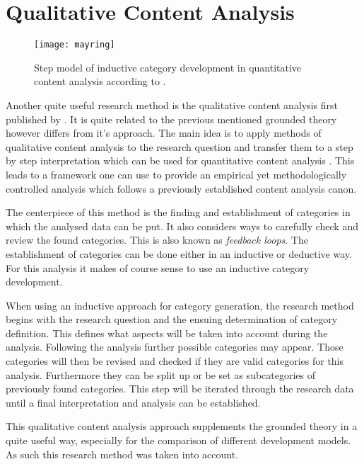 
\section{Qualitative Content Analysis} %

\begin{figure}[htbp]
  \centering
  \texttt{[image: mayring]}
  \caption{Step model of inductive category development in quantitative content
    analysis according to \citeauthor{Mayring2008} \cite{Mayring2000,Mayring2008}.}
\end{figure}

Another quite useful research method is the qualitative content analysis first
published by \textcite{Mayring2008}. It is quite related to the previous
mentioned grounded theory however differs from it's approach. The main idea is
to apply methods of qualitative content analysis to the research question and
transfer them to a step by step interpretation which can be used for
quantitative content analysis \cite{Mayring2000}. This leads to a framework one
can use to provide an empirical yet methodologically controlled analysis which
follows a previously established content analysis canon.

The centerpiece of this method is the finding and establishment of categories
in which the analysed data can be put. It also considers ways to carefully
check and review the found categories. This is also known as \emph{feedback
loops}. The establishment of categories can be done either in an inductive or
deductive way. For this analysis it makes of course sense to use an inductive
category development.

When using an inductive approach for category generation, the research method
begins with the research question and the ensuing determination of category
definition. This defines what aspects will be taken into account during the
analysis. Following the analysis further possible categories may appear. Those
categories will then be revised and checked if they are valid categories for
this analysis. Furthermore they can be split up or be set as subcategories of
previously found categories. This step will be iterated through the research
data until a final interpretation and analysis can be established.

This qualitative content analysis approach supplements the grounded theory in a
quite useful way, especially for the comparison of different development
models. As such this research method was taken into account.

